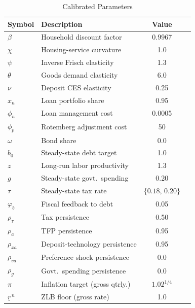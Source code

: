 \documentclass[]{article}
\begin{document}
\begin{table}[h]
\centering
\begin{tabular}{llcc}
\toprule
Symbol & Description & Value \\
\midrule
$\beta$      & Household discount factor        & 0.9967 \\
$\chi$       & Housing-service curvature        & 1.0    \\
$\psi$       & Inverse Frisch elasticity        & 1.3    \\
$\theta$     & Goods demand elasticity          & 6.0    \\
$\nu$        & Deposit CES elasticity           & 0.25   \\
$x_n$        & Loan portfolio share             & 0.95   \\
$\phi_n$     & Loan management cost             & 0.0005 \\
$\phi_p$     & Rotemberg adjustment cost        & 50     \\
$\omega$     & Bond share                       & 0.0    \\
$b_0$        & Steady-state debt target         & 1.0    \\
$z$          & Long-run labor productivity      & 1.3    \\
$g$      & Steady-state govt.\ spending     & 0.20   \\
$\tau$    & Steady-state tax rate            & $\{0.18,\, 0.20\}$   \\
$\varphi_b$  & Fiscal feedback to debt          & 0.05   \\
$\rho_\tau$  & Tax persistence                  & 0.50   \\
$\rho_a$     & TFP persistence                  & 0.95   \\
$\rho_{xa}$  & Deposit-technology persistence   & 0.95   \\
$\rho_{va}$  & Preference shock persistence     & 0.0    \\
$\rho_g$     & Govt.\ spending persistence      & 0.0    \\
$\pi$     & Inflation target (gross qtrly.)  & $1.02^{1/4}$ \\
$\underline{r}^{\,n}$ & ZLB floor (gross rate) & 1.0    \\
\bottomrule
\end{tabular}
\caption{Calibrated Parameters}
\label{tab:calib}
\end{table}


\clearpage
\end{document}
